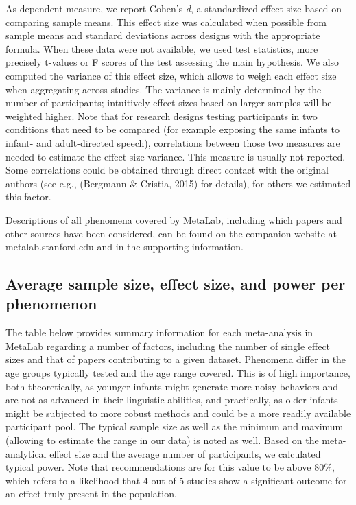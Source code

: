 \documentclass[english,floatsintext,man]{apa6}
\newcounter{author}
\begin{document}
As dependent measure, we report Cohen's \emph{d}, a standardized effect
size based on comparing sample means. This effect size was calculated
when possible from sample means and standard deviations across designs
with the appropriate formula. When these data were not available, we
used test statistics, more precisely t-values or F scores of the test
assessing the main hypothesis. We also computed the variance of this
effect size, which allows to weigh each effect size when aggregating
across studies. The variance is mainly determined by the number of
participants; intuitively effect sizes based on larger samples will be
weighted higher. Note that for research designs testing participants in
two conditions that need to be compared (for example exposing the same
infants to infant- and adult-directed speech), correlations between
those two measures are needed to estimate the effect size variance. This
measure is usually not reported. Some correlations could be obtained
through direct contact with the original authors (see e.g., (Bergmann \&
Cristia, 2015) for details), for others we estimated this factor.

Descriptions of all phenomena covered by MetaLab, including which papers
and other sources have been considered, can be found on the companion
website at metalab.stanford.edu and in the supporting information.

\subsection{Average sample size, effect size, and power per
phenomenon}\label{average-sample-size-effect-size-and-power-per-phenomenon}

The table below provides summary information for each meta-analysis in
MetaLab regarding a number of factors, including the number of single
effect sizes and that of papers contributing to a given dataset.
Phenomena differ in the age groups typically tested and the age range
covered. This is of high importance, both theoretically, as younger
infants might generate more noisy behaviors and are not as advanced in
their linguistic abilities, and practically, as older infants might be
subjected to more robust methods and could be a more readily available
participant pool. The typical sample size as well as the minimum and
maximum (allowing to estimate the range in our data) is noted as well.
Based on the meta-analytical effect size and the average number of
participants, we calculated typical power. Note that recommendations are
for this value to be above 80\%, which refers to a likelihood that 4 out
of 5 studies show a significant outcome for an effect truly present in
the population.
\end{document}
